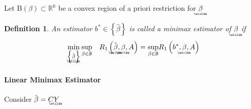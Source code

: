 \documentclass{article}
\newtheorem{definition}[theorem]{Definition}
\begin{document}
Let B$\left( \beta \right) \subset \mathbb{R}^{k}$ be a convex region of a
priori restriction for $\underaccent{\wtilde}{\beta}$\bigskip

\begin{definition}
An estimator $b^{\ast }\in \left\{ \hat{\beta}\right\} $ is called a \textsf{%
minimax estimator} of $%
\underaccent{\wtilde}{\beta}%
$ if%
\begin{equation}
\underset{\left\{ 
\underaccent{\wtilde}{\hat{\beta}}%
\right\} }{\min }\,\underset{\beta \in \mathbb{B}}{\sup }\quad R_{1}\left( %
\underaccent{\wtilde}{\hat{\beta}},\underaccent{\wtilde}{\beta},A\right) =%
\underset{\beta \in \mathbb{B}}{\sup }R_{1}\left( b^{\ast },%
\underaccent{\wtilde}{\beta},A\right)
\end{equation}
\end{definition}

\bigskip

\paragraph{Linear Minimax Estimator}

Consider $\hat{\beta}=C%
\underaccent{\wtilde}{Y}%
$
\end{document}
